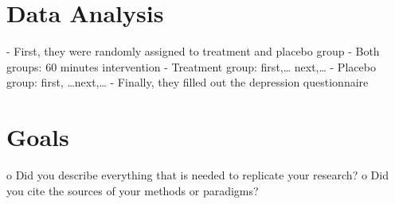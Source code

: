 \section{Data Analysis}
\label{data-analysis}

- First, they were randomly assigned to treatment and placebo group
- Both groups: 60 minutes intervention
- Treatment group: first,… next,…
- Placebo group: first, …next,…
- Finally, they filled out the depression questionnaire

\section{Goals}
\label{chapter2-goals}

o Did you describe everything that is needed to replicate your research?
o Did you cite the sources of your methods or paradigms?
